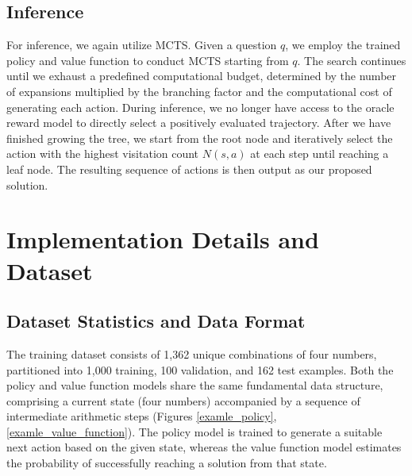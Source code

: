 \documentclass{article}
\begin{document}
\subsection{Inference}
For inference, we again utilize MCTS. Given a question $q$, we employ the trained policy and value function to conduct MCTS starting from $q$. The search continues until we exhaust a predefined computational budget, determined by the number of expansions multiplied by the branching factor and the computational cost of generating each action. During inference, we no longer have access to the oracle reward model to directly select a positively evaluated trajectory. After we have finished growing the tree, we start from the root node and iteratively select the action with the highest visitation count $N(s,a)$ at each step until reaching a leaf node. The resulting sequence of actions is then output as our proposed solution.

\section{Implementation Details and Dataset}


\subsection{Dataset Statistics and Data Format}

The training dataset consists of 1,362 unique combinations of four numbers, partitioned into 1,000 training, 100 validation, and 162 test examples. Both the policy and value function models share the same fundamental data structure, comprising a current state (four numbers) accompanied by a sequence of intermediate arithmetic steps (Figures \ref{examle_policy}, \ref{examle_value_function}). The policy model is trained to generate a suitable next action based on the given state, whereas the value function model estimates the probability of successfully reaching a solution from that state.
\end{document}
